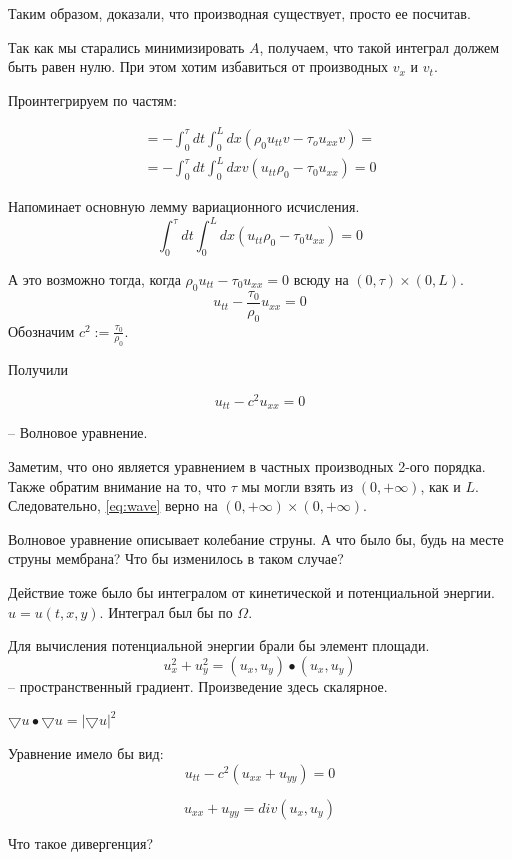 \documentclass[12pt]{report}
\begin{document}
Таким образом, доказали, что производная существует, просто ее посчитав. 

Так как мы старались минимизировать $A$, получаем, что такой интеграл должем быть равен нулю. При этом хотим избавиться от производных $v_x$ и $v_t$.

Проинтегрируем по частям: 

$$
\begin{gathered}
    = - \int^{\tau}_{0}{dt \int^{L}_{0}{dx(\rho_0 u_{tt} v - \tau_o u_{xx}v)}} =
    \\
    = - \int^{\tau}_{0}{dt \int^{L}_{0}{dx v (u_{tt}\rho_0 - \tau_0 u_{xx})}} = 0 
\end{gathered}
$$

Напоминает основную лемму вариационного исчисления.
$$
    \int_{0}^{\tau}{dt \int^{L}_{0}{dx(u_{tt} \rho_0 - \tau_0 u_{xx})}} = 0
$$

А это возможно тогда, когда $\rho_0 u_{tt} - \tau_0 u_{xx} = 0$ всюду на $(0, \tau) \times (0, L)$.
$$u_{tt} - \frac{\tau_0}{\rho_0}u_{xx} = 0$$ Обозначим $c^2 := \frac{\tau_0}{\rho_0}$.

Получили 

\begin{equation} \label{eq:wave}
    u_{tt} - c ^ 2 u_{xx} = 0
\end{equation}

-- Волновое уравнение. 

Заметим, что оно является уравнением в частных производных 2-ого порядка. Также обратим внимание на то, что $\tau$ мы могли взять из $(0, +\infty)$, как и $L$. Следовательно, \eqref{eq:wave} верно на $(0, +\infty) \times (0, +\infty)$.

Волновое уравнение описывает колебание струны. А что было бы, будь на месте струны мембрана? Что бы изменилось в таком случае? 

Действие тоже было бы интегралом от кинетической и потенциальной энергии. $u = u(t,x,y)$. Интеграл был бы по $\Omega$.

Для вычисления потенциальной энергии брали бы элемент площади. 
$$
    u_x^2 + u_y^2 = (u_x, u_y) \bullet (u_x, u_y)
$$
-- пространственный градиент. Произведение здесь скалярное. 

$\bigtriangledown u \bullet \bigtriangledown u = |\bigtriangledown u| ^ 2$

Уравнение имело бы вид: 
$$u_{tt} - c ^ 2(u_{xx} + u_{yy}) = 0$$

$$u_{xx} + u_{yy} = div(u_x, u_y)$$

Что такое дивергенция? 
\end{document}
